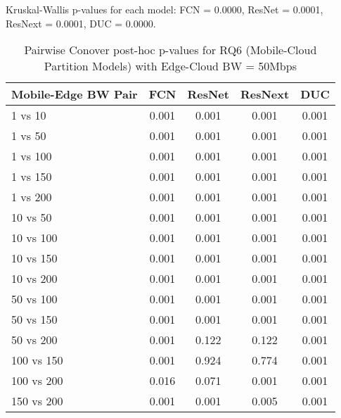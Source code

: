\begin{table}[h]
\centering
\caption{Pairwise Conover post-hoc p-values for RQ6 (Mobile-Cloud Partition Models) with Edge-Cloud BW = 50Mbps}
\label{tab:conover_mobile_cloud_partition_ec50}
\smallskip
Kruskal-Wallis p-values for each model: FCN = 0.0000, ResNet = 0.0001, ResNext = 0.0001, DUC = 0.0000.

\begin{tabular}{lcccc}
\toprule
Mobile-Edge BW Pair & FCN & ResNet & ResNext & DUC \\
\midrule
1 vs 10 & 0.001 & 0.001 & 0.001 & 0.001 \\
1 vs 50 & 0.001 & 0.001 & 0.001 & 0.001 \\
1 vs 100 & 0.001 & 0.001 & 0.001 & 0.001 \\
1 vs 150 & 0.001 & 0.001 & 0.001 & 0.001 \\
1 vs 200 & 0.001 & 0.001 & 0.001 & 0.001 \\
10 vs 50 & 0.001 & 0.001 & 0.001 & 0.001 \\
10 vs 100 & 0.001 & 0.001 & 0.001 & 0.001 \\
10 vs 150 & 0.001 & 0.001 & 0.001 & 0.001 \\
10 vs 200 & 0.001 & 0.001 & 0.001 & 0.001 \\
50 vs 100 & 0.001 & 0.001 & 0.001 & 0.001 \\
50 vs 150 & 0.001 & 0.001 & 0.001 & 0.001 \\
50 vs 200 & 0.001 & 0.122 & 0.122 & 0.001 \\
100 vs 150 & 0.001 & 0.924 & 0.774 & 0.001 \\
100 vs 200 & 0.016 & 0.071 & 0.001 & 0.001 \\
150 vs 200 & 0.001 & 0.001 & 0.005 & 0.001 \\
\bottomrule
\end{tabular}
\end{table}

